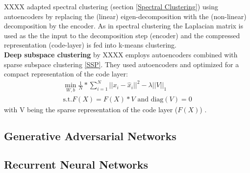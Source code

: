 \documentclass[../main.tex]{subfiles}
\begin{document}
    XXXX adapted spectral clustering (section \ref{Spectral Clustering}) using autoencoders by replacing the (linear) eigen-decomposition with the (non-linear) decomposition by the encoder. As in spectral clustering the Laplacian matrix is used as the the input to the decomposition step (encoder) and the compressed representation (code-layer) is fed into k-means clustering. \\
    \textbf{Deep subspace clustering} by XXXX employs autoencoders combined with sparse subspace clustering \ref{SSP}. They used autoencoders and optimized for a compact representation of the code layer: 
        \begin{equation}
            \begin{split}
                \min_{W,b} \frac{1}{N}*\sum_{i=1}^N ||x_i - \hat{x}_i||^2 - \lambda ||V||_1 \\
                \text{s.t.} F(X) = F(X)*V \text{ and diag}(V)=0 
            \end{split}
        \end{equation}
        with V being the sparse representation of the code layer ($F(X)$) .

\subsection{Generative Adversarial Networks}

\subsection{Recurrent Neural Networks}
\end{document}

